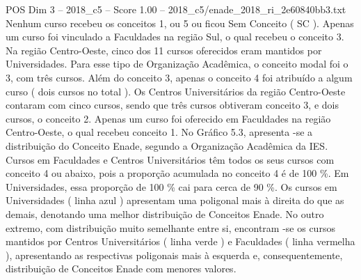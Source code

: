 \begin{textsample}{POS Dim 3 – 2018\_c5 – Score 1.00 – 2018\_c5/enade\_2018\_ri\_2e60840bb3.txt}
Nenhum curso recebeu os conceitos 1, ou 5 ou ficou Sem Conceito ( SC ).
Apenas um curso foi vinculado a Faculdades na região Sul, o qual recebeu o conceito 3.
Na região Centro-Oeste, cinco dos 11 cursos oferecidos eram mantidos por Universidades.
Para esse tipo de Organização Acadêmica, o conceito modal foi o 3, com três cursos.
Além do conceito 3, apenas o conceito 4 foi atribuído a algum curso ( dois cursos no total ).
Os Centros Universitários da região Centro-Oeste contaram com cinco cursos, sendo que três cursos obtiveram conceito 3, e dois cursos, o conceito 2.
Apenas um curso foi oferecido em Faculdades na região Centro-Oeste, o qual recebeu conceito 1.
No Gráfico 5.3, apresenta -se a distribuição do Conceito Enade, segundo a Organização Acadêmica da IES.
Cursos em Faculdades e Centros Universitários têm todos os seus cursos com conceito 4 ou abaixo, pois a proporção acumulada no conceito 4 é de 100 \%.
Em Universidades, essa proporção de 100 \% cai para cerca de 90 \%.
Os cursos em Universidades ( linha azul ) apresentam uma poligonal mais à direita do que as demais, denotando uma melhor distribuição de Conceitos Enade.
No outro extremo, com distribuição muito semelhante entre si, encontram -se os cursos mantidos por Centros Universitários ( linha verde ) e Faculdades ( linha vermelha ), apresentando as respectivas poligonais mais à esquerda e, consequentemente, distribuição de Conceitos Enade com menores valores.

\end{textsample}
